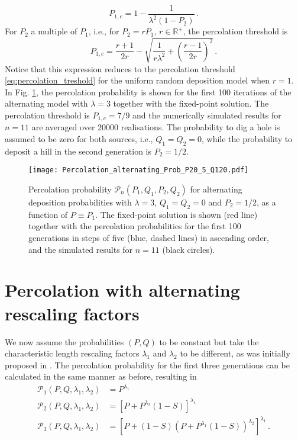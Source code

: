 \documentclass[amsmath,amssymb,amsfonts,aps,pre,preprint,superscriptaddress,bibnotes,showpacs,showkeys,longbibliography,nofootinbib]{revtex4-1}
\begin{document}
\begin{equation}
    \label{eq:percolation_threshold_alternating}
    P_{1,c} = 1-\frac{1}{\lambda^2 (1-P_2)}\, .
\end{equation}
For $P_2$ a multiple of $P_1$, i.e., for $P_2 = r P_1$, $r\in\mathbb{R}^+$, the percolation threshold is
\begin{equation}
    P_{1,c} = \frac{r+1}{2r}-\sqrt{\frac{1}{r\lambda^2} + \left(\frac{r-1}{2r}\right)^2}\, .
\end{equation}
Notice that this expression reduces to the percolation threshold \eqref{eq:percolation_treshold} for the uniform random deposition model when $r=1$. In Fig. \ref{fig:perc_alt_prob}, the percolation probability is shown for the first 100 iterations of the alternating model with $\lambda = 3$ together with the fixed-point solution. The percolation threshold is $P_{1,c} = 7/9$ and the numerically simulated results for $n=11$ are averaged over 20000 realisations. The probability to dig a hole is assumed to be zero for both sources, i.e., $Q_1 = Q_2 = 0$, while the probability to deposit a hill in the second generation is $P_2 = 1/2$.
\begin{figure}[!htp]
    \centering
    \texttt{[image: Percolation\_alternating\_Prob\_P20\_5\_Q120.pdf]}
    \caption{Percolation probability $\mathcal{P}_n(P_1,Q_1,P_2,Q_2)$ for alternating deposition probabilities with $\lambda = 3$, $Q_1= Q_2=0$ and $P_2 = 1/2$, as a function of $P \equiv P_1$. The fixed-point solution is shown (red line) together with the percolation probabilities for the first 100 generations in steps of five (blue, dashed lines) in ascending order, and the simulated results for $n=11$ (black circles).}
    \label{fig:perc_alt_prob}
\end{figure}

\section{Percolation with alternating rescaling factors}\label{sec:alternating_scale}
We now assume the probabilities $(P,Q)$ to be constant but take the characteristic length rescaling factors $\lambda_1$ and $\lambda_2$ to be different, as was initially proposed in \cite{Indekeu2001}. The percolation probability for the first three generations can be calculated in the same manner as before, resulting in
\begin{equation}
    \label{eq:alternating_percolation_scale_examples}
    \begin{split}
        \mathcal{P}_1(P,Q,\lambda_1,\lambda_2) &= P^{\lambda_1}\\
        \mathcal{P}_2(P,Q,\lambda_1,\lambda_2) &= \left[P + P^{\lambda_2}\left(1-S\right)\right]^{\lambda_1}\\
        \mathcal{P}_3(P,Q,\lambda_1,\lambda_2) &= \left[P +\left(1-S\right)\left(P + P^{\lambda_1}(1-S)\right)^{\lambda_2}\right]^{\lambda_1}\, .
    \end{split}
\end{equation}
\end{document}
